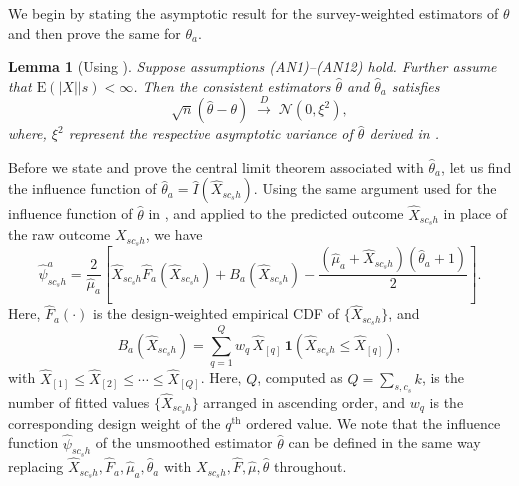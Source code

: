 \documentclass[12pt]{article}
\theoremstyle{plain}
\newtheorem{lemma}{Lemma}
\theoremstyle{definition}
\begin{document}
We begin by stating the asymptotic result for the survey-weighted estimators of $\theta$ and then prove the same for $\theta_a$.
\noindent\begin{lemma} [Using \cite{Bhattacharya2007}]
\label{lem:clt_theta}
Suppose assumptions {(AN1)--(AN12)} hold. Further assume that $\text{E}\left(|X|\big|s \right)<\infty$. Then the consistent estimators $\hat{\theta}$ and $\hat{\theta}_a$ satisfies
\[
\sqrt{n}\left(\hat{\theta} - \theta \right)
\;\xrightarrow{D}\;
\mathcal{N}(0, \xi^2),
\]
where, $\xi^2$ represent the respective asymptotic variance of $\hat{\theta}$ derived in \cite{Bhattacharya2007}.
\end{lemma}
Before we state and prove the central limit theorem associated with $\hat{\theta}_a$, let us find the influence function of $\hat\theta_a=\hat I(\hat X_{sc_sh})$. Using the same
argument used for the influence function of $\hat\theta$ in \citet{Bhattacharya2007}, and applied to
the predicted outcome $\hat X_{sc_sh}$ in place of the raw outcome $X_{sc_sh}$, we have
\begin{equation}
\hat{\psi}^a_{sc_sh}
= \frac{2}{\hat{\mu}_a}\left[\hat{X}_{sc_sh}\hat{F}_a(\hat{X}_{sc_sh}) + B_a(\hat{X}_{sc_sh})
- \frac{(\hat{\mu}_a + \hat{X}_{sc_sh})(\hat{\theta}_a+1)}{2}\right].
\label{eq:psi-a-def}
\end{equation}
Here, $\hat F_a(\cdot)$ is the design-weighted empirical CDF of $\{\hat X_{sc_sh}\}$, and
\begin{equation}
B_a(\hat{X}_{sc_sh}) = \sum_{q=1}^{Q} w_q\, \hat{X}_{[q]}\,\mathbf{1}\!\left(\hat{X}_{sc_sh}\leq \hat{X}_{[q]}\right),
\label{eq:Ba-def}
\end{equation}
with $\hat{X}_{[1]}\leq\hat{X}_{[2]}\leq\cdots\leq\hat{X}_{[Q]}$. Here, $Q$, computed as $Q=\sum_{s,c_s} k$, is the number of
fitted values $\{\hat X_{sc_sh}\}$ arranged in ascending order, and $w_q$ is the corresponding design
weight of the $q^{\text{th}}$ ordered value. We note that the influence function $\hat\psi_{sc_sh}$ of the unsmoothed
estimator $\hat\theta$ can be defined in the same way replacing $\hat X_{sc_sh},\hat F_a,\hat\mu_a,\hat\theta_a$
with $X_{sc_sh},\hat F,\hat\mu,\hat\theta$ throughout.
\end{document}
